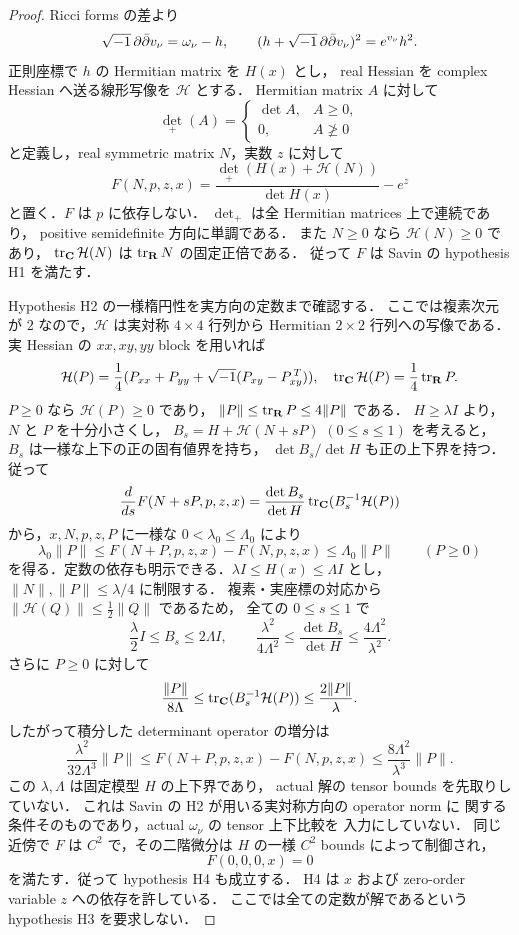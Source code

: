 \begin{proof}
Ricci forms の差より
\begin{equation}\label{moving:eq:small-KE-equation}
 \sqrt{-1}\,\partial\bar\partial v_\nu=\omega_\nu-h,
 \qquad (h+\sqrt{-1}\,\partial\bar\partial v_\nu)^2=e^{v_\nu}h^2.
\end{equation}
正則座標で $h$ の Hermitian matrix を $H(x)$ とし，
real Hessian を complex Hessian へ送る線形写像を $\mathcal H$ とする．
Hermitian matrix $A$ に対して
\[
 \det_+(A)=
 \begin{cases}
  \det A,& A\ge0,\\
  0,& A\not\ge0
 \end{cases}
\]
と定義し，real symmetric matrix $N$，実数 $z$ に対して
\begin{equation}\label{moving:eq:Savin-operator}
 F(N,p,z,x)
 =\frac{\det_+(H(x)+\mathcal H(N))}{\det H(x)}-e^z
\end{equation}
と置く．$F$ は $p$ に依存しない．
$\det_+$ は全 Hermitian matrices 上で連続であり，
positive semidefinite 方向に単調である．
また $N\ge0$ なら $\mathcal H(N)\ge0$ であり，
$\operatorname{tr}_{\mathbf C}\mathcal H(N)$ は $\operatorname{tr}_{\mathbf R}N$ の固定正倍である．
従って $F$ は Savin の hypothesis H1 を満たす．

Hypothesis H2 の一様楕円性を実方向の定数まで確認する．
ここでは複素次元が $2$ なので，$\mathcal H$ は実対称
$4\times4$ 行列から Hermitian $2\times2$ 行列への写像である．
実 Hessian の $xx,xy,yy$ block を用いれば
\[
 \mathcal H(P)=\frac14(P_{xx}+P_{yy}
              +\sqrt{-1}(P_{xy}-P_{xy}^{\,T})),
 \quad
 \operatorname{tr}_{\mathbf C}\mathcal H(P)=\frac14\operatorname{tr}_{\mathbf R}P .
\]
$P\ge0$ なら $\mathcal H(P)\ge0$ であり，
$\|P\|\le\operatorname{tr}_{\mathbf R}P\le4\|P\|$ である．
$H\ge\lambda I$ より，$N$ と $P$ を十分小さくし，
$B_s=H+\mathcal H(N+sP)$ $(0\le s\le1)$ を考えると，
$B_s$ は一様な上下の正の固有値界を持ち，
$\det B_s/\det H$ も正の上下界を持つ．従って
\[
 \frac{d}{ds}F(N+sP,p,z,x)
 =\frac{\det B_s}{\det H}
       \operatorname{tr}_{\mathbf C}(B_s^{-1}\mathcal H(P))
\]
から，$x,N,p,z,P$ に一様な $0<\lambda_0\le\Lambda_0$ により
\[
 \lambda_0\|P\|\le F(N+P,p,z,x)-F(N,p,z,x)
                   \le\Lambda_0\|P\|\qquad(P\ge0)
\]
を得る．定数の依存も明示できる．\(\lambda I\le H(x)\le\Lambda I\) とし，
\(\|N\|,\|P\|\le\lambda/4\) に制限する．
複素・実座標の対応から
\(\|\mathcal H(Q)\|\le\tfrac12\|Q\|\) であるため，
全ての \(0\le s\le1\) で
\[
 \frac{\lambda}{2}I\le B_s\le2\Lambda I,\qquad
 \frac{\lambda^2}{4\Lambda^2}
 \le\frac{\det B_s}{\det H}
 \le\frac{4\Lambda^2}{\lambda^2}.
\]
さらに \(P\ge0\) に対して
\[
 \frac{\|P\|}{8\Lambda}
 \le\operatorname{tr}_{\mathbf C}(B_s^{-1}\mathcal H(P))
 \le\frac{2\|P\|}{\lambda}.
\]
したがって積分した determinant operator の増分は
\[
 \frac{\lambda^2}{32\Lambda^3}\|P\|
 \le F(N+P,p,z,x)-F(N,p,z,x)
 \le\frac{8\Lambda^2}{\lambda^3}\|P\|.
\]
この \(\lambda,\Lambda\) は固定模型 \(H\) の上下界であり，
actual 解の tensor bounds を先取りしていない．
これは Savin の H2 が用いる実対称方向の operator norm に
関する条件そのものであり，actual $\omega_\nu$ の tensor 上下比較を
入力にしていない．
同じ近傍で $F$ は $C^2$ で，その二階微分は $H$ の一様 $C^2$ bounds によって制御され，
\[
 F(0,0,0,x)=0
\]
を満たす．従って hypothesis H4 も成立する．
H4 は $x$ および zero-order variable $z$ への依存を許している．
ここでは全ての定数が解であるという hypothesis H3 を要求しない．


\end{proof}
